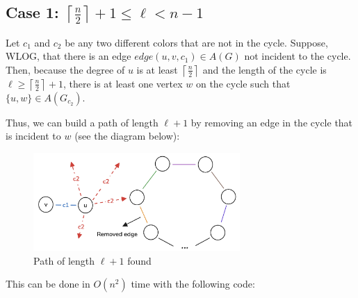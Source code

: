 \subsection{Case 1: \(\left \lceil \frac{n}{2} \right \rceil + 1 \leq \ell < n - 1 \)}

Let $c_1$ and $c_2$ be any two different colors that are not in the cycle. Suppose, WLOG, that 
there is an edge $edge(u, v, c_1) \in A(G)$ not incident to the cycle. Then, because
the degree of $u$ is at least $\left \lceil \frac{n}{2} \right \rceil$ and the 
length of the cycle is $\ell \geq \left \lceil \frac{n}{2} \right \rceil + 1$, there is at least
one vertex $w$ on the cycle such that $\{u, w\} \in A(G_{c_2})$.

Thus, we can build a path of length $\ell + 1$ by removing an edge in the cycle that is incident
to $w$ (see the diagram below):

\begin{figure}[H]
    \centering
    \includegraphics[width=0.7\textwidth]{figuras/cycle_path_extension.png}
    \caption{Path of length \( \ell + 1 \) found}
    \label{fig:cycle_path_extension}
\end{figure}

This can be done in $O(n^2)$ time with the following code:

